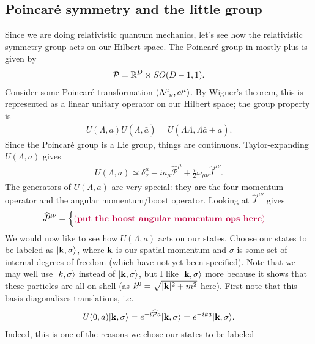 \documentclass[11pt]{article}
\begin{document}
\subsection{Poincaré symmetry and the little group}
Since we are doing relativistic quantum mechanics, let's
see how the relativistic symmetry group acts on our Hilbert space.
The Poincaré group in mostly-plus is given by
\begin{align*}
    \mathcal{P} = \mathbb{R}^D \rtimes SO(D - 1, 1).
\end{align*}
Consider some Poincaré transformation $(\Lambda\indices{^\mu_\nu}, a^\mu)$.
By Wigner's theorem, this is represented as a linear unitary operator on
our Hilbert space; the group property is
\begin{align*}
    U(\Lambda, a) U(\bar{\Lambda}, \bar{a}) = U(\Lambda \bar{\Lambda}, \Lambda \bar{a} + a).
\end{align*}
Since the Poincaré group is a Lie group, things are continuous.
Taylor-expanding $U(\Lambda, a)$ gives
\begin{align*}
    U(\Lambda, a) \simeq \delta^{\mu}_{\nu} - i a_\mu \widehat{\mathcal{P}}^\mu + \frac{i}{2} \omega_{\mu \nu} \widehat{J}^{\mu \nu}.
\end{align*}
The generators of $U(\Lambda, a)$ are very special: they are the
four-momentum operator and the angular momentum/boost operator.
Looking at $\widehat{J}^{\mu \nu}$ gives
\begin{align*}
    \widehat{J}^{\mu \nu} = \begin{cases}
        \color{purple} (\textbf{put the boost angular momentum ops here}) \color{black}
    \end{cases}
\end{align*}
We would now like to see how $U(\Lambda, a)$ acts on our states.
Choose our states to be labeled as $\lvert\mathbf{k}, \sigma\rangle$, where
$\mathbf{k}$ is our spatial momentum and $\sigma$ is some set of internal
degrees of freedom (which have not yet been specified). Note that
we may well use $\lvert k, \sigma\rangle$ instead of $\lvert\mathbf{k}, \sigma\rangle$,
but I like $\lvert\mathbf{k}, \sigma\rangle$ more because it shows that these
particles are all on-shell (as $k^0 = \sqrt{|\mathbf{k}|^2 + m^2}$ here).
First note that this basis diagonalizes translations, i.e.
\begin{align*}
    U(0, a) \lvert\mathbf{k}, \sigma\rangle = e^{- i \widehat{\mathcal{P}} a} \lvert\mathbf{k}, \sigma\rangle = e^{-i k a} \lvert\mathbf{k}, \sigma\rangle.
\end{align*}
Indeed, this is one of the reasons we chose our states to be labeled
\end{document}
